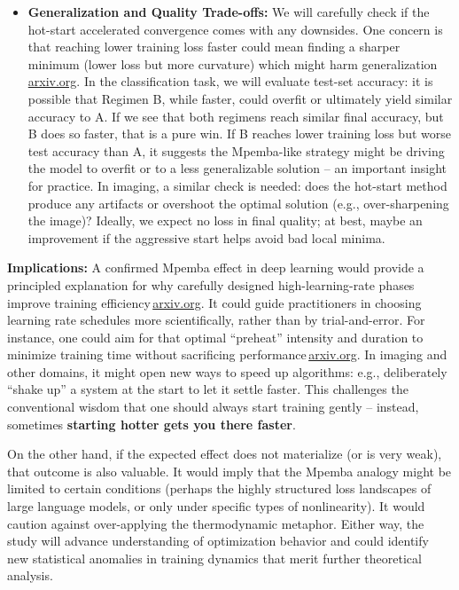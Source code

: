 \documentclass[11pt]{article}
\begin{document}
\begin{itemize}
  \item \textbf{Generalization and Quality Trade-offs:} We will carefully check if the hot-start accelerated convergence comes with any downsides. One concern is that reaching lower training loss faster could mean finding a sharper minimum (lower loss but more curvature) which might harm generalization\,\href{https://arxiv.org/html/2507.04206v1#:~:text=Generalization vs,bias training toward sharper minima}{arxiv.org}. In the classification task, we will evaluate test-set accuracy: it is possible that Regimen B, while faster, could overfit or ultimately yield similar accuracy to A. If we see that both regimens reach similar final accuracy, but B does so faster, that is a pure win. If B reaches lower training loss but worse test accuracy than A, it suggests the Mpemba-like strategy might be driving the model to overfit or to a less generalizable solution -- an important insight for practice. In imaging, a similar check is needed: does the hot-start method produce any artifacts or overshoot the optimal solution (e.g., over-sharpening the image)? Ideally, we expect no loss in final quality; at best, maybe an improvement if the aggressive start helps avoid bad local minima.
\end{itemize}

\textbf{Implications:} A confirmed Mpemba effect in deep learning would provide a principled explanation for why carefully designed high-learning-rate phases improve training efficiency\,\href{https://arxiv.org/html/2507.04206v1#:~:text=and the choice of plateau,exists an optimal plateau learning}{arxiv.org}. It could guide practitioners in choosing learning rate schedules more scientifically, rather than by trial-and-error. For instance, one could aim for that optimal ``preheat'' intensity and duration to minimize training time without sacrificing performance\,\href{https://arxiv.org/html/2507.04206v1#:~:text=explanation for the necessity of,LLMs with minimal hyperparameter sweep}{arxiv.org}. In imaging and other domains, it might open new ways to speed up algorithms: e.g., deliberately ``shake up'' a system at the start to let it settle faster. This challenges the conventional wisdom that one should always start training gently -- instead, sometimes \textbf{starting hotter gets you there faster}.

On the other hand, if the expected effect does not materialize (or is very weak), that outcome is also valuable. It would imply that the Mpemba analogy might be limited to certain conditions (perhaps the highly structured loss landscapes of large language models, or only under specific types of nonlinearity). It would caution against over-applying the thermodynamic metaphor. Either way, the study will advance understanding of optimization behavior and could identify new statistical anomalies in training dynamics that merit further theoretical analysis.
\end{document}
